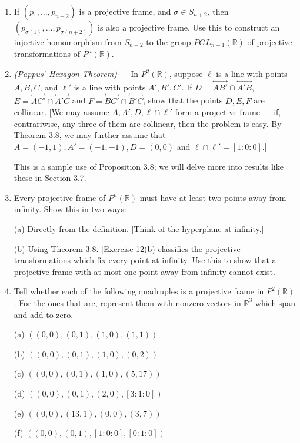 \documentclass[leqno]{book}
\begin{document}
\begin{enumerate}
\item If $(p_1,\dots,p_{n+2})$ is a projective frame, and $\sigma\in S_{n+2}$, then $(p_{\sigma(1)},\dots,p_{\sigma(n+2)})$ is also a projective frame.  Use this to construct an injective homomorphism from $S_{n+2}$ to the group $PGL_{n+1}(\mathbb R)$ of projective transformations of $P^n(\mathbb R)$.

\item\emph{(Pappus' Hexagon Theorem)} \---- In $P^2(\mathbb R)$, suppose $\ell$ is a line with points $A,B,C$, and $\ell'$ is a line with points $A',B',C'$.  If $D=\overset{\longleftrightarrow}{AB'}\cap\overset{\longleftrightarrow}{A'B}$, $E=\overset{\longleftrightarrow}{AC'}\cap\overset{\longleftrightarrow}{A'C}$ and $F=\overset{\longleftrightarrow}{BC'}\cap\overset{\longleftrightarrow}{B'C}$, show that the points $D,E,F$ are collinear.  [We may assume $A,A',D,\ell\cap\ell'$ form a projective frame \---- if, contrariwise, any three of them are collinear, then the problem is easy.  By Theorem 3.8, we may further assume that $A=(-1,1),A'=(-1,-1),D=(0,0)$ and $\ell\cap\ell'=[1:0:0]$.]

This is a sample use of Proposition 3.8; we will delve more into results like these in Section 3.7.

\item Every projective frame of $P^n(\mathbb R)$ must have at least two points away from infinity.  Show this in two ways:

(a) Directly from the definition.  [Think of the hyperplane at infinity.]

(b) Using Theorem 3.8.  [Exercise 12(b) classifies the projective transformations which fix every point at infinity.  Use this to show that a projective frame with at most one point away from infinity cannot exist.]

\item Tell whether each of the following quadruples is a projective frame in $P^2(\mathbb R)$.  For the ones that are, represent them with nonzero vectors in $\mathbb R^3$ which span and add to zero.

(a) $((0,0),(0,1),(1,0),(1,1))$

(b) $((0,0),(0,1),(1,0),(0,2))$

(c) $((0,0),(0,1),(1,0),(5,17))$

(d) $((0,0),(0,1),(2,0),[3:1:0])$

(e) $((0,0),(13,1),(0,0),(3,7))$

(f) $((0,0),(0,1),[1:0:0],[0:1:0])$


\end{enumerate}
\end{document}
